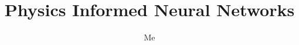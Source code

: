 \documentclass{article}
\author{Me}
\title{Physics Informed Neural Networks}
\begin{document}
\maketitle 





{}

\end{document}
